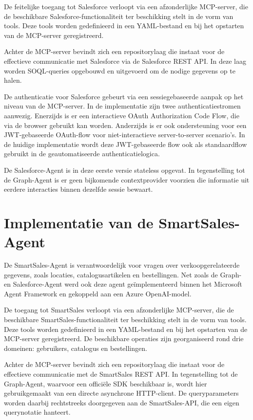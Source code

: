 De feitelijke toegang tot Salesforce verloopt via een afzonderlijke \gls{MCP}-server, die de beschikbare Salesforce-functionaliteit ter beschikking stelt in de vorm van tools. Deze tools worden gedefinieerd in een YAML-bestand en bij het opstarten van de \gls{MCP}-server geregistreerd.

Achter de \gls{MCP}-server bevindt zich een repositorylaag die instaat voor de effectieve communicatie met Salesforce via de Salesforce \gls{REST} \gls{API}. In deze laag worden SOQL-queries opgebouwd en uitgevoerd om de nodige gegevens op te halen.

De authenticatie voor Salesforce gebeurt via een sessiegebaseerde aanpak op het niveau van de \gls{MCP}-server. In de implementatie zijn twee authenticatiestromen aanwezig. Enerzijds is er een interactieve \gls{OAuth} Authorization Code Flow, die via de browser gebruikt kan worden. Anderzijds is er ook ondersteuning voor een \gls{JWT}-gebaseerde \gls{OAuth}-flow voor niet-interactieve server-to-server scenario's. In de huidige implementatie wordt deze \gls{JWT}-gebaseerde flow ook als standaardflow gebruikt in de geautomatiseerde authenticatielogica.

De Salesforce-Agent is in deze eerste versie stateless opgevat. In tegenstelling tot de Graph-Agent is er geen bijkomende contextprovider voorzien die informatie uit eerdere interacties binnen dezelfde sessie bewaart.


\section{Implementatie van de SmartSales-Agent}
\label{sec:impl-smartsales}

De SmartSales-Agent is verantwoordelijk voor vragen over verkoopgerelateerde gegevens, zoals locaties, catalogusartikelen en bestellingen. Net zoals de Graph- en Salesforce-Agent werd ook deze agent geïmplementeerd binnen het Microsoft Agent Framework en gekoppeld aan een Azure OpenAI-model.

De toegang tot SmartSales verloopt via een afzonderlijke \gls{MCP}-server, die de beschikbare SmartSales-functionaliteit ter beschikking stelt in de vorm van tools. Deze tools worden gedefinieerd in een YAML-bestand en bij het opstarten van de \gls{MCP}-server geregistreerd. De beschikbare operaties zijn georganiseerd rond drie domeinen: gebruikers, catalogus en bestellingen.

Achter de \gls{MCP}-server bevindt zich een repositorylaag die instaat voor de effectieve communicatie met de SmartSales \gls{REST} \gls{API}. In tegenstelling tot de Graph-Agent, waarvoor een officiële \gls{SDK} beschikbaar is, wordt hier gebruikgemaakt van een directe asynchrone HTTP-client. De queryparameters worden daarbij rechtstreeks doorgegeven aan de SmartSales-\gls{API}, die een eigen querynotatie hanteert.

